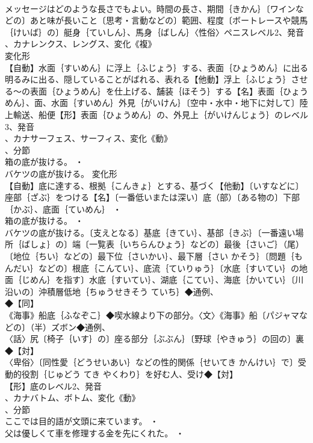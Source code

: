 \documentclass[8pt]{extreport}
\begin{document}
\begin{CJK}{UTF8}{min}
\\	メッセージはどのような長さでもよい。時間の長さ、期間｛きかん｝〔ワインなどの〕あと味が長いこと〔思考・言動などの〕範囲、程度〔ボートレースや競馬｛けいば｝の〕艇身｛ていしん｝、馬身｛ばしん｝〈性俗〉ペニスレベル2、発音
\\	、カナレンクス、レングス、変化《複》
\\	変化形 
\\	【自動】水面｛すいめん｝に浮上｛ふじょう｝する、表面｛ひょうめん｝に出る明るみに出る、隠していることがばれる、表れる【他動】浮上｛ふじょう｝させる～の表面｛ひょうめん｝を仕上げる、舗装｛ほそう｝する【名】表面｛ひょうめん｝、面、水面｛すいめん｝外見｛がいけん｝〔空中・水中・地下に対して〕陸上輸送、船便【形】表面｛ひょうめん｝の、外見上｛がいけんじょう｝のレベル3、発音
\\	、カナサーフェス、サーフィス、変化《動》
\\	、分節
\\	箱の底が抜ける。 ・
\\	バケツの底が抜ける。	変化形 
\\	【自動】底に達する、根拠｛こんきょ｝とする、基づく【他動】〔いすなどに〕座部｛ざぶ｝をつける【名】〔一番低いまたは深い〕底（部）〔ある物の〕下部｛かぶ｝、底面｛ていめん｝ ・
\\	箱の底が抜ける。 ・
\\	バケツの底が抜ける。〔支えとなる〕基底｛きてい｝、基部｛きぶ｝〔一番遠い場所｛ばしょ｝の〕端〔一覧表｛いちらんひょう｝などの〕最後｛さいご｝（尾）〔地位｛ちい｝などの〕最下位｛さいかい｝、最下層｛さい かそう｝〔問題｛もんだい｝などの〕根底｛こんてい｝、底流｛ていりゅう｝〔水底｛すいてい｝の地面｛じめん｝を指す〕水底｛すいてい｝、湖底｛こてい｝、海底｛かいてい｝〔川沿いの〕沖積層低地｛ちゅうせきそう ていち｝◆通例、
\\	◆【同】
\\	《海事》船底｛ふなぞこ｝◆喫水線より下の部分。〈文〉《海事》船〔パジャマなどの〕（半）ズボン◆通例、
\\	〈話〉尻〔椅子｛いす｝の〕座る部分｛ぶぶん｝〔野球｛やきゅう｝の回の〕裏◆【対】
\\	〈卑俗〉〔同性愛｛どうせいあい｝などの性的関係｛せいてき かんけい｝で〕受動的役割｛じゅどう てき やくわり｝を好む人、受け◆【対】
\\	【形】底のレベル2、発音
\\	、カナバトム、ボトム、変化《動》
\\	、分節
\\	ここでは目的語が文頭に来ています。 ・
\\	父は優しくて車を修理する金を先にくれた。 ・

\end{CJK}
\end{document}
